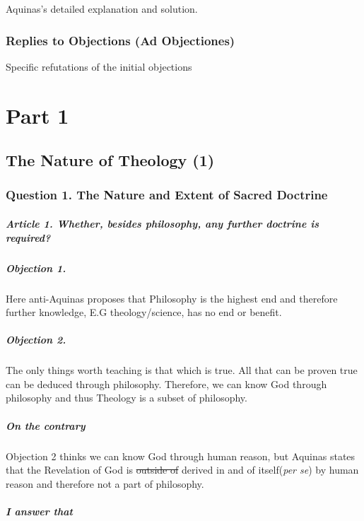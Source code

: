 \documentclass{ucetd}
\begin{document}
Aquinas's detailed explanation and solution.
\subsection*{Replies to Objections (Ad Objectiones)}

Specific refutations of the initial objections
\clearpage

\chapter{Part 1}

\section{The Nature of Theology (1)}

\subsection{Question 1. The Nature and Extent of Sacred Doctrine }
\paragraph{Article 1. Whether, besides philosophy, any further doctrine is required?}
\paragraph{Objection 1.}

Here anti-Aquinas proposes that Philosophy is the highest end and therefore further knowledge, E.G theology/science, has no end or benefit.
\paragraph{Objection 2.}

The only things worth teaching is that which is  true. All that can be proven true can be deduced through philosophy. Therefore, we can know God through philosophy and thus Theology is a subset of philosophy. 
\paragraph{On the contrary}
Objection 2 thinks we can know God through human reason, but Aquinas states that the Revelation of God is \sout{outside of} derived in and of itself(\textit{per se}) by human reason and therefore not a part of philosophy.
\paragraph{I answer that}
\end{document}
